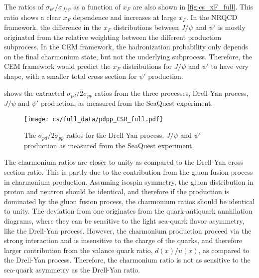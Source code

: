 \documentclass[../main.tex]{subfiles}
\begin{document}
The ratios of $\sigma_{\psi'}/\sigma_{J/\psi}$ as a function of $x_F$ are also shown in \cref{fig:cs_xF_full}.
This ratio shows a clear $x_F$ dependence and increases at large $x_F$. In the NRQCD framework,
the difference in the $x_F$ distributions between $J/\psi$ and $\psi'$ is mostly originated
from the relative weighting between the different production subprocess.
In the CEM framework, the hadronization probability only depends on
the final charmonium state, but not the underlying subprocess. Therefore, the CEM framework would predict
the $x_F$ distributions for $J/\psi$ and $\psi'$ to have very shape, with a smaller total cross section
for $\psi'$ production.

 shows the extracted $\sigma_{pd}/2\sigma_{pp}$ ratios from the three processes,
Drell-Yan process, $J/\psi$ and $\psi'$ production, as measured from the SeaQuest experiment.
\begin{figure}[h!]
	\centering
	\texttt{[image: cs/full\_data/pdpp\_CSR\_full.pdf]}
	\caption{The $\sigma_{pd}/2\sigma_{pp}$ ratios for the Drell-Yan process, $J/\psi$ and $\psi'$ production
		as measured from the SeaQuest experiment.
	}
	\label{fig:csr_all_process}
\end{figure}
The charmonium ratios are closer to unity as compared to the Drell-Yan cross section ratio. This
is partly due to the contribution from the gluon fusion process in charmonium production. Assuming
isospin symmetry, the gluon distribution in proton and neutron should be identical, and therefore
if the production is dominated by the gluon fusion process, the charmonium ratios should be identical
to unity. The deviation from one originates from the quark-antiquark annhilation diagrams, where they
can be sensitive to the light sea-quark flavor asymmetry, like the Drell-Yan process. However, the charmonium
production proceed via the strong interaction and is insensitive to the charge of the quarks, and therefore
larger contribution from the valance quark ratio, $d(x)/u(x)$, as compared to the Drell-Yan process. Therefore,
the charmonium ratio is not as sensitive to the sea-quark asymmetry as the Drell-Yan ratio.


\FloatBarrier
\end{document}
